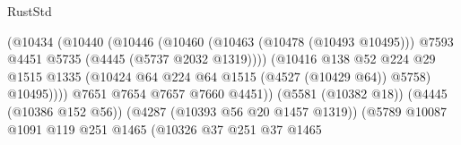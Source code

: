 \begin{lexlean}{RustStd}
\begin{coremodule}
{\begin{coremodule}
{{{{{{{{{{{{{{{{{{{{{{{{{{{{{{{{{{{{{{                                                  (@10434
                                                    (@10440
                                                      (@10446
                                                        (@10460
                                                          (@10463 (@10478 (@10493 @10495)))
                                                          @7593
                                                          @4451
                                                          @5735
                                                          (@4445 (@5737 @2032 @1319))))
                                                      (@10416
                                                        @138
                                                        @52
                                                        @224
                                                        @29
                                                        @1515
                                                        @1335
                                                        (@10424
                                                          @64
                                                          @224
                                                          @64
                                                          @1515
                                                          (@4527 (@10429 @64))
                                                          @5758)
                                                        @10495))))
                                                @7651
                                                @7654
                                                @7657
                                                @7660
                                                @4451))
                                            (@5581 (@10382 @18))
                                            (@4445 (@10386 @152 @56))
                                            (@4287 (@10393 @56 @20 @1457 @1319))
                                            (@5789
                                              @10087
                                              @1091
                                              @119
                                              @251
                                              @1465
                                              (@10326
                                                @37
                                                @251
                                                @37
                                                @1465
}}}}}}}}}}}}}}}}}}}}}}}}}}}}}}}}}}}}}}
\end{coremodule}}
\end{coremodule}
\end{lexlean}
